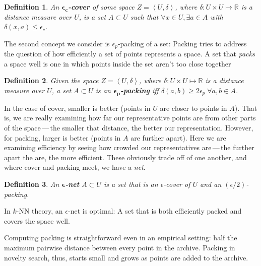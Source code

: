\documentclass[twoside]{article}
\newtheorem{definition}{Definition}
\newcommand{\IR}{\mathbb{R}}
\begin{document}
\begin{definition}
An $\boldsymbol{\epsilon_c}$\textbf{-cover} of some space $Z=\left\langle U, \delta\right\rangle$, where $\delta: U\times U \mapsto \IR$ is a distance measure over $U$, is a set $A \subset U$ such that $\forall x\in U, \exists a\in A$ with $\delta(x,a) \leq \epsilon_c$. 
\end{definition}

The second concept we consider is $\epsilon_p$-packing of a set:  Packing tries to address the question of how efficiently a set of points represents a space.  A set that \emph{packs} a space well is one in which points inside the set aren't too close together

\begin{definition}
Given the space $Z=\left\langle U, \delta\right\rangle$, where $\delta: U\times U \mapsto \IR$ is a distance measure over $U$, a set $A\subset U$ is an $\boldsymbol{\epsilon_p}$\textbf{-packing} iff $\delta(a,b) \geq 2\epsilon_p \; \forall a,b \in A$. 
\end{definition}

In the case of cover, smaller is better (points in $U$ are closer to points in $A$).  That is, we are really examining how far our representative points are from other parts of the space\,---\,the smaller that distance, the better our representation.  However, for packing, larger is better (points in $A$ are further apart).  Here we are examining efficiency by seeing how crowded our representatives are\,---\,the further apart the are, the more efficient.  These obviously trade off of one another, and where cover and packing meet, we have a \emph{net}.  

\begin{definition}
An $\boldsymbol{\epsilon}$\textbf{-net} $A \subset U$ is a set that is an $\epsilon$-cover of $U$ and an $(\epsilon/2)$-packing.
\end{definition}
%
In $k$-NN theory, an $\epsilon$-net is optimal:  A set that is both efficiently packed and covers the space well.

Computing packing is straightforward even in an empirical setting:  half the maximum pairwise distance between every point in the archive.  Packing in novelty search, thus, starts small and grows as points are added to the archive. 
\end{document}

